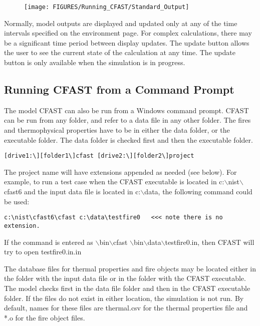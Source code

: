 \begin{figure}[h!]
\begin{center}
\texttt{[image: FIGURES/Running\_CFAST/Standard\_Output]}
\end{center}
\end{figure}

Normally, model outputs are displayed and updated only at any of the time intervals specified on the environment page. For complex calculations, there may be a significant time period between display updates. The update button allows the user to see the current state of the calculation at any time. The update button is only available when the simulation is in progress.


\subsection{Running CFAST from a Command Prompt}

The model CFAST can also be run from a Windows command prompt.  CFAST can be run from any folder, and refer to a data file in any other folder. The fires and thermophysical properties have to be in either the data folder, or the executable folder. The data folder is checked first and then the executable folder.

\begin{lstlisting}
[drive1:\][folder1\]cfast [drive2:\][folder2\]project
\end{lstlisting}

The project name will have extensions appended as needed (see below). For example, to run a test case when the CFAST executable is located in c:$\backslash$nist$\backslash$cfast6 and the input data file is located in c:$\backslash$data, the following command could be used:

\begin{lstlisting}
c:\nist\cfast6\cfast c:\data\testfire0   <<< note there is no extension.
\end{lstlisting}

If the command is entered as $\backslash$bin$\backslash$cfast $\backslash$bin$\backslash$data$\backslash$testfire0.in, then CFAST will try to open testfire0.in.in

The database files for thermal properties and fire objects may be located either in the folder with the input data file or in the folder with the CFAST executable. The model checks first in the data file folder and then in the CFAST executable folder.  If the files do not exist in either location, the simulation is not run. By default, names for these files are thermal.csv for the thermal properties file and *.o for the fire object files.

